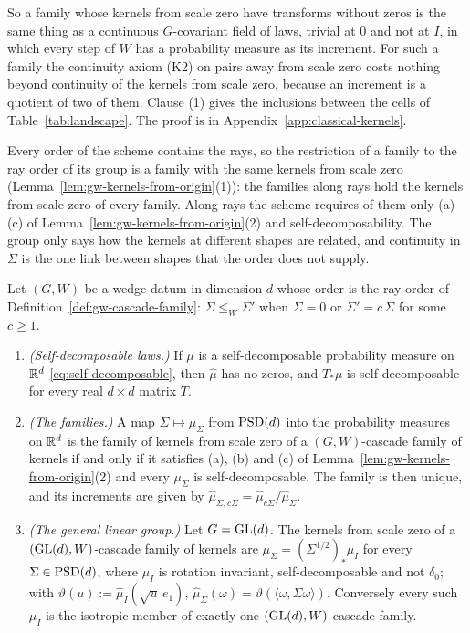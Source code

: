 So a family whose kernels from scale zero have transforms without zeros is the same thing as a
continuous $G$-covariant field of laws, trivial at $0$ and not at $I$, in which every step of $W$ has a
probability measure as its increment. For such a family the continuity axiom (K2) on pairs away
from scale zero costs nothing beyond continuity of the kernels from scale zero, because an increment
is a quotient of two of them. Clause (1) gives the inclusions between the cells of Table~\ref{tab:landscape}. The proof is in
Appendix~\ref{app:classical-kernels}.

Every order of the scheme contains the rays, so the restriction of a family to the ray order of its
group is a family with the same kernels from scale zero (Lemma~\ref{lem:gw-kernels-from-origin}(1)):
the families along rays hold the kernels from scale zero of every family. Along rays the scheme requires of
them only (a)--(c) of Lemma~\ref{lem:gw-kernels-from-origin}(2) and self-decomposability. The group only says how the kernels
at different shapes are related, and continuity in $\Sigma$ is the one link between shapes that the
order does not supply.

\begin{proposition}\label{prop:gw-ray-families}
Let $(G, W)$ be a wedge datum in dimension $d$ whose order is the ray order of
Definition~\ref{def:gw-cascade-family}: $\Sigma \le_W \Sigma'$ when $\Sigma = 0$ or $\Sigma' = c\,\Sigma$ for some
$c \ge 1$.
\begin{enumerate}
\item \emph{(Self-decomposable laws.)} If $\mu$ is a self-decomposable probability measure on $\mathbb{R}^d$
\ref{eq:self-decomposable}, then $\widehat\mu$ has no zeros, and $T_*\mu$ is self-decomposable for
every real $d \times d$ matrix $T$.
\item \emph{(The families.)} A map $\Sigma \mapsto \mu_\Sigma$ from $\mathrm{PSD}(d)$ into the probability
measures on $\mathbb{R}^d$ is the family of kernels from scale zero of a $(G, W)$-cascade family of kernels if
and only if it satisfies (a), (b) and (c) of Lemma~\ref{lem:gw-kernels-from-origin}(2) and every $\mu_\Sigma$
is self-decomposable. The family is then unique, and its increments are given by
$\widehat\mu_{\Sigma,c\Sigma} = \widehat\mu_{c\Sigma}/\widehat\mu_\Sigma$.
\item \emph{(The general linear group.)} Let $G = \mathrm{GL}(d)$. The kernels from scale zero of a
$(\mathrm{GL}(d), W)$-cascade family of kernels are $\mu_\Sigma = (\Sigma^{1/2})_*\mu_I$ for every
$\Sigma \in \mathrm{PSD}(d)$, where $\mu_I$ is rotation invariant, self-decomposable and not $\delta_0$; with
$\vartheta(u) := \widehat\mu_I(\sqrt u\,e_1)$, $\widehat\mu_\Sigma(\omega) = \vartheta(\langle\omega,\Sigma\omega\rangle)$.
Conversely every such $\mu_I$ is the isotropic member of exactly one $(\mathrm{GL}(d), W)$-cascade family.
\end{enumerate}
\end{proposition}

